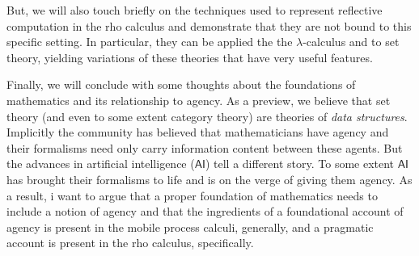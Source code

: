 But, we will also touch briefly on the techniques used to represent
reflective computation in the rho calculus and demonstrate that they
are not bound to this specific setting. In particular, they can be
applied the the $\lambda$-calculus and to set theory, yielding
variations of these theories that have very useful features.

Finally, we will conclude with some thoughts about the foundations of
mathematics and its relationship to agency. As a preview, we believe
that set theory (and even to some extent category theory) are theories
of \emph{data structures}. Implicitly the community has believed that
mathematicians have agency and their formalisms need only carry
information content between these agents. But the advances in
artificial intelligence ($\mathsf{AI}$) tell a different story. To
some extent $\mathsf{AI}$ has brought their formalisms to life and is
on the verge of giving them agency. As a result, i want to argue that
a proper foundation of mathematics needs to include a notion of agency
and that the ingredients of a foundational account of agency is
present in the mobile process calculi, generally, and a pragmatic
account is present in the rho calculus, specifically.

